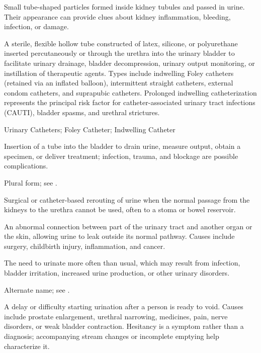 Small tube-shaped particles formed inside kidney tubules and passed in urine. Their appearance can provide clues about kidney inflammation, bleeding, infection, or damage.

 A sterile, flexible hollow tube constructed of latex, silicone, or polyurethane inserted percutaneously or through the urethra into the urinary bladder to facilitate urinary drainage, bladder decompression, urinary output monitoring, or instillation of therapeutic agents. Types include indwelling Foley catheters (retained via an inflated balloon), intermittent straight catheters, external condom catheters, and suprapubic catheters. Prolonged indwelling catheterization represents the principal risk factor for catheter-associated urinary tract infections (CAUTI), bladder spasms, and urethral strictures.

\synonyms
Urinary Catheters; Foley Catheter; Indwelling Catheter

 Insertion of a tube into the bladder to drain urine, measure output, obtain a specimen, or deliver treatment; infection, trauma, and blockage are possible complications.

 Plural form; see .

 Surgical or catheter-based rerouting of urine when the normal passage from the kidneys to the urethra cannot be used, often to a stoma or bowel reservoir.

 An abnormal connection between part of the urinary tract and another organ or the skin, allowing urine to leak outside its normal pathway. Causes include surgery, childbirth injury, inflammation, and cancer.

 The need to urinate more often than usual, which may result from infection, bladder irritation, increased urine production, or other urinary disorders.

 Alternate name; see .

 A delay or difficulty starting urination after a person is
ready to void. Causes include prostate enlargement, urethral narrowing, medicines, pain,
nerve disorders, or weak bladder contraction. Hesitancy is a symptom rather than a
diagnosis; accompanying stream changes or incomplete emptying help characterize it.


